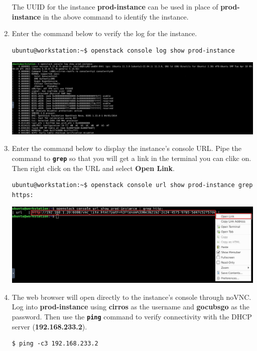 \documentclass[letterpaper, 12pt]{article}
\begin{document}
\begin{enumerate}
    \begin{tipbox}{}
        The UUID for the instance \textbf{prod-instance} can be used in place of \textbf{prod-instance} in the above
        command to identify the instance.
    \end{tipbox}

    \item Enter the command below to verify the log for the instance.
\begin{lstlisting}
ubuntu@workstation:~$ openstack console log show prod-instance
\end{lstlisting}

    \begin{center}
        \includegraphics[width=\linewidth]{images/part_2_step_15.png}
    \end{center}

    \item Enter the command below to display the instance's console URL. Pipe the command to \textbf{\texttt{grep}} so
    that you will get a link in the terminal you can clikc on. Then right click on the URL and select \textbf{Open
    Link}.
\begin{lstlisting}
ubuntu@workstation:~$ openstack console url show prod-instance grep https:
\end{lstlisting}

    \begin{center}
        \includegraphics[width=\linewidth]{images/part_2_step_16.png}
    \end{center}

    \item The web browser will open directly to the instance's console through noVNC. Log into \textbf{prod-instance}
    using \textbf{cirros} as the username and \textbf{gocubsgo} as the password. Then use the \textbf{\texttt{ping}}
    command to verify connectivity with the DHCP server (\textbf{192.168.233.2}).
\begin{lstlisting}
$ ping -c3 192.168.233.2
\end{lstlisting}


\end{enumerate}
\end{document}
